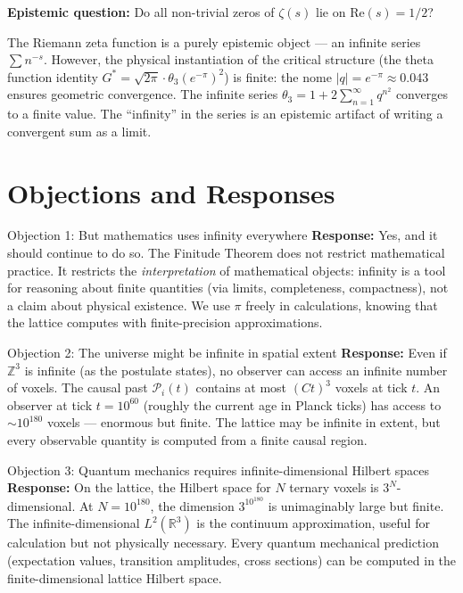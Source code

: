 \documentclass[11pt]{article}
\theoremstyle{tight}
\theoremstyle{plainroman}
\newcommand{\R}{\mathbb{R}}
\newcommand{\Z}{\mathbb{Z}}
\begin{document}
\textbf{Epistemic question:} Do all non-trivial zeros of $\zeta(s)$ lie on $\mathrm{Re}(s)=1/2$?

The Riemann zeta function is a purely epistemic object --- an infinite series $\sum n^{-s}$.
However, the physical instantiation of the critical structure (the theta function identity $G^*=\sqrt{2\pi}\cdot\theta_3(e^{-\pi})^2$) is finite: the nome $|q|=e^{-\pi}\approx 0.043$ ensures geometric convergence.
The infinite series $\theta_3=1+2\sum_{n=1}^\infty q^{n^2}$ converges to a finite value.
The ``infinity'' in the series is an epistemic artifact of writing a convergent sum as a limit.

\section{Objections and Responses}

\begin{statusbox}{Objection 1: But mathematics uses infinity everywhere}
\textbf{Response:} Yes, and it should continue to do so.
The Finitude Theorem does not restrict mathematical practice.
It restricts the \emph{interpretation} of mathematical objects: infinity is a tool for reasoning about finite quantities (via limits, completeness, compactness), not a claim about physical existence.
We use $\pi$ freely in calculations, knowing that the lattice computes with finite-precision approximations.
\end{statusbox}

\begin{statusbox}{Objection 2: The universe might be infinite in spatial extent}
\textbf{Response:} Even if $\Z^3$ is infinite (as the postulate states), no observer can access an infinite number of voxels.
The causal past $\mathcal P_i(t)$ contains at most $(Ct)^3$ voxels at tick $t$.
An observer at tick $t=10^{60}$ (roughly the current age in Planck ticks) has access to $\sim 10^{180}$ voxels --- enormous but finite.
The lattice may be infinite in extent, but every observable quantity is computed from a finite causal region.
\end{statusbox}

\begin{statusbox}{Objection 3: Quantum mechanics requires infinite-dimensional Hilbert spaces}
\textbf{Response:} On the lattice, the Hilbert space for $N$ ternary voxels is $3^N$-dimensional.
At $N=10^{180}$, the dimension $3^{10^{180}}$ is unimaginably large but finite.
The infinite-dimensional $L^2(\R^3)$ is the continuum approximation, useful for calculation but not physically necessary.
Every quantum mechanical prediction (expectation values, transition amplitudes, cross sections) can be computed in the finite-dimensional lattice Hilbert space.
\end{statusbox}
\end{document}
